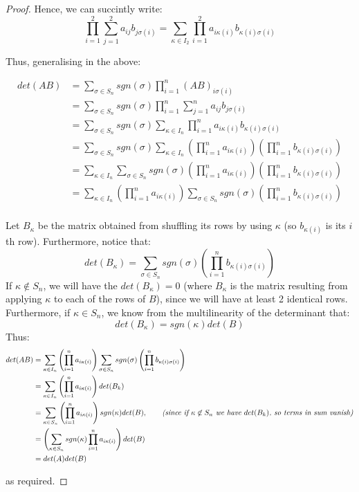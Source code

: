 \documentclass{exam}
\begin{document}
\begin{proof}
Hence, we can succintly write:
\[
\prod_{i = 1}^2 \sum_{j = 1}^2 a_{ij}b_{j\sigma(i)} = \sum_{\kappa \in I_2} \prod_{i = 1}^2 a_{i\kappa(i)}b_{\kappa(i)\sigma(i)}
\]

Thus, generalising in the above:

\begin{align*}
    det(AB) &= \sum_{\sigma \in S_n} sgn(\sigma) \prod_{i = 1}^n (AB)_{i \sigma(i)} \\
    &= \sum_{\sigma \in S_n} sgn(\sigma) \prod_{i = 1}^n \sum_{j = 1}^n a_{ij}b_{j\sigma(i)} \\
    &= \sum_{\sigma \in S_n} sgn(\sigma) \sum_{\kappa \in I_n} \prod_{i = 1}^n a_{i\kappa(i)}b_{\kappa(i)\sigma(i)} \\
    &= \sum_{\sigma \in S_n} sgn(\sigma) \sum_{\kappa \in I_n} \left(\prod_{i = 1}^n a_{i\kappa(i)}\right)\left(\prod_{i = 1}^nb_{\kappa(i)\sigma(i)}\right) \\
    &= \sum_{\kappa \in I_n} \sum_{\sigma \in S_n} sgn(\sigma) \left(\prod_{i = 1}^n a_{i\kappa(i)}\right)\left(\prod_{i = 1}^nb_{\kappa(i)\sigma(i)}\right) \\
    &= \sum_{\kappa \in I_n} \left(\prod_{i = 1}^n a_{i\kappa(i)}\right) \sum_{\sigma \in S_n} sgn(\sigma) \left(\prod_{i = 1}^nb_{\kappa(i)\sigma(i)}\right) \\
\end{align*}

Let $B_\kappa$ be the matrix obtained from shuffling its rows by using $\kappa$ (so $b_{\kappa(i)}$ is its $i$th row). Furthermore, notice that:
\[
det(B_\kappa) = \sum_{\sigma \in S_n} sgn(\sigma) \left(\prod_{i = 1}^nb_{\kappa(i)\sigma(i)}\right)
\]
If $\kappa \not\in S_n$, we will have the $det(B_\kappa) = 0$ (where $B_\kappa$ is the matrix resulting from applying $\kappa$ to each of the rows of $B$), since we will have at least 2 identical rows. Furthermore, if $\kappa \in S_n$, we know from the multilinearity of the determinant that:
\[
det(B_\kappa) = sgn(\kappa)det(B)
\]
Thus:
\begin{align*}
    det(AB) &= \sum_{\kappa \in I_n} \left(\prod_{i = 1}^n a_{i\kappa(i)}\right) \sum_{\sigma \in S_n} sgn(\sigma) \left(\prod_{i = 1}^nb_{\kappa(i)\sigma(i)}\right) \\
    &= \sum_{\kappa \in I_n} \left(\prod_{i = 1}^n a_{i\kappa(i)}\right) det(B_k) \\
    &= \sum_{\kappa \in S_n} \left(\prod_{i = 1}^n a_{i\kappa(i)}\right) sgn(\kappa)det(B), \qquad \text{\textit{(since if $\kappa \not\in S_n$ we have $det(B_k)$, so terms in sum vanish)}} \\
    &= \left(\sum_{\kappa \in S_n} sgn(\kappa) \prod_{i = 1}^n a_{i\kappa(i)} \right)det(B) \\
    &= det(A)det(B) \\
\end{align*}

as required.


\end{proof}
\end{document}
